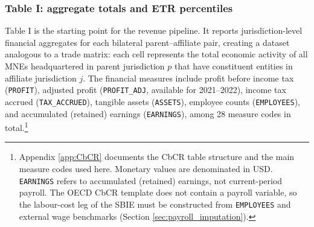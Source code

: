 \documentclass[11pt,a4paper]{article}
\newcommand{\code}[1]{\texttt{#1}}
\begin{document}
\subsubsection{Table I: aggregate totals and ETR percentiles}\label{sec:t1_main}

Table I is the starting point for the revenue pipeline. It reports jurisdiction-level financial aggregates for each bilateral parent--affiliate pair, creating a dataset analogous to a trade matrix: each cell represents the total economic activity of all MNEs headquartered in parent jurisdiction $p$ that have constituent entities in affiliate jurisdiction $j$. The financial measures include profit before income tax (\code{PROFIT}), adjusted profit (\code{PROFIT\_ADJ}, available for 2021--2022), income tax accrued (\code{TAX\_ACCRUED}), tangible assets (\code{ASSETS}), employee counts (\code{EMPLOYEES}), and accumulated (retained) earnings (\code{EARNINGS}), among 28 measure codes in total.\footnote{Appendix \ref{app:CbCR} documents the CbCR table structure and the main measure codes used here. Monetary values are denominated in USD. \code{EARNINGS} refers to accumulated (retained) earnings, not current-period payroll. The OECD CbCR template does not contain a payroll variable, so the labour-cost leg of the SBIE must be constructed from \code{EMPLOYEES} and external wage benchmarks (Section \ref{sec:payroll_imputation}).}
\end{document}
